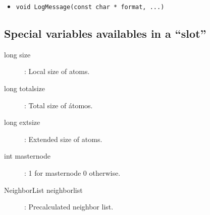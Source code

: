\documentclass[a4paper,12pt]{article}
\begin{document}
\begin{itemize}
\item \verb'void LogMessage(const char * format, ...)'
\end{itemize}

\subsection{Special variables availables in a ``slot''}

\begin{description}
\item[long size]{: Local size of atoms.}
\item[long totalsize]{: Total size of \'atomos.}
\item[long extsize]{: Extended size of atoms.}
\item[int masternode]{: 1 for masternode 0 otherwise.}
\item[NeighborList neighborlist]{: Precalculated neighbor list.}
\end{description}
\end{document}
